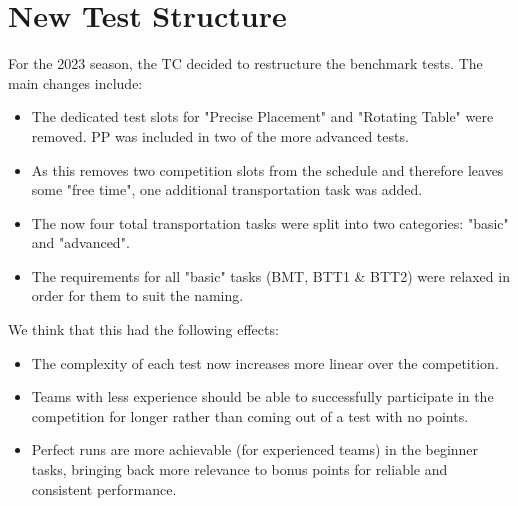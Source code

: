 

\section{New Test Structure}
\label{sec:New Test Structure}

For the 2023 season, the TC decided to restructure the benchmark tests.
The main changes include:

\begin{itemize}
\item The dedicated test slots for "Precise Placement" and "Rotating Table" were removed. 
PP was included in two of the more advanced tests.
\item As this removes two competition slots from the schedule and therefore leaves some "free time", 
one additional transportation task was added.
\item The now four total transportation tasks were split into two categories: "basic" and "advanced".
\item The requirements for all "basic" tasks (BMT, BTT1 \& BTT2) were relaxed in order for them to suit the naming.
\end{itemize}

We think that this had the following effects:

\begin{itemize}
\item The complexity of each test now increases more linear over the competition.
\item Teams with less experience should be able to successfully participate in the competition for longer rather than coming out of a test with no points.
\item Perfect runs are more achievable (for experienced teams) in the beginner tasks,
 bringing back more relevance to bonus points for reliable and consistent performance.
\end{itemize}

